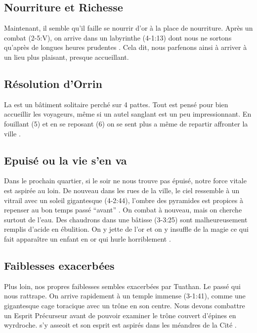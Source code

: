 \documentclass[11pt]{article}
\begin{document}
\subsection{Nourriture et Richesse}
Maintenant, il semble qu'il faille se nourrir d'or à la place de nourriture. Après un combat (2-5:V), on arrive dans un labyrinthe (4-1:13) dont nous ne sortons qu'après de longues heures prudentes . Cela dit, nous parfenons ainsi à arriver à un lieu plus plaisant, presque accueillant.

\subsection{Résolution d'Orrin}
La \resolutionorrin{} est un bâtiment solitaire perché sur 4 pattes. Tout est pensé pour bien accueillir les voyageurs, même si un autel sanglant est un peu impressionnant. En fouillant (5)  et en se reposant (6) on se sent plus a même de repartir affronter la ville \gain{\life[5], \terror[-5]}.

\subsection{Epuisé ou la vie s'en va}
Dans le prochain quartier, si le soir ne nous trouve pas épuisé, notre force vitale est aspirée au loin. De nouveau dans les rues de la ville, le ciel ressemble à un vitrail avec un soleil gigantesque (4-2:44), l'ombre des pyramides est propices à repenser au bon temps passé ``avant'' . On combat à nouveau, mais on cherche surtout de l'eau. Des chaudrons dans une bâtisse (3-3:25) sont malheureusement remplis d'acide en ébulition. On y jette de l'or et on y insuffle de la magie  ce qui fait apparaître un enfant en or qui hurle horriblement .

\subsection{Faiblesses exacerbées}
Plus loin, nos propres faiblesses sembles exacerbées par Tuathan. Le passé qui nous rattrape. On arrive rapidement à un temple immense (3-1:41), comme une gigantesque cage toracique avec un trône en son centre. Nous devons combattre un Esprit Précurseur avant de pouvoir examiner le trône couvert d'épines en wyrdroche. \ailei{} s'y asseoit et son esprit est aspirés dans les méandres de la Cité .
\end{document}
